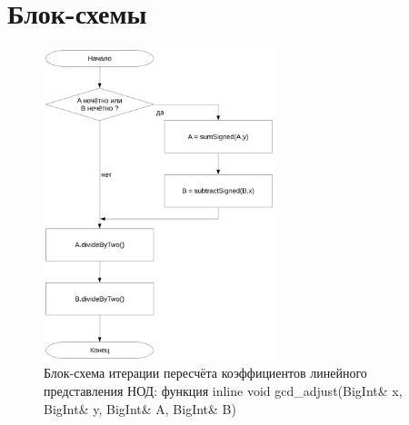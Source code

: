 \documentclass[a4paper,12pt]{article} %
\begin{document}
\section*{Блок-схемы}


\begin{figure}[ht]
	\includegraphics[width=0.6\textwidth]{lr4_gcd_adjust.pdf}
	\caption{
		Блок-схема итерации пересчёта коэффициентов линейного представления НОД:
		функция inline void gcd\_adjust(BigInt\& x, BigInt\& y, BigInt\& A, BigInt\& B)
	}
	\label{bs_gcd_adjust}
\end{figure}
\end{document}
